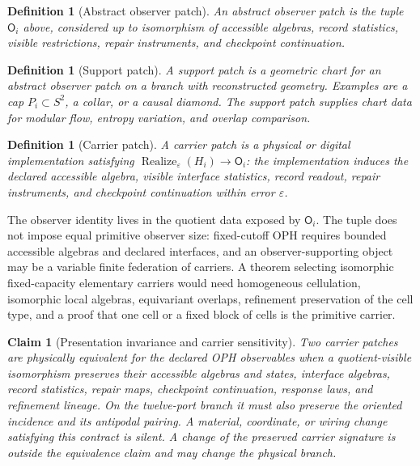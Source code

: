 \documentclass[11pt]{article}
\newtheorem{definition}[theorem]{Definition}
\newtheorem{claim}[theorem]{Claim}
\theoremstyle{remark}
\theoremstyle{plain}
\begin{document}
\begin{definition}[Abstract observer patch]
An abstract observer patch is the tuple \(\mathsf O_i\) above, considered up to isomorphism of
accessible algebras, record statistics, visible restrictions, repair instruments, and checkpoint
continuation.
\end{definition}

\begin{definition}[Support patch]
A support patch is a geometric chart for an abstract observer patch on a branch with reconstructed
geometry. Examples are a cap \(P_i\subset S^2\), a collar, or a causal diamond.
The support patch supplies chart data for modular flow, entropy variation, and overlap comparison.
\end{definition}

\begin{definition}[Carrier patch]
A carrier patch is a physical or digital implementation satisfying
\(\operatorname{Realize}_{\varepsilon}(H_i)\to\mathsf O_i\):
the implementation induces the declared accessible algebra, visible interface
statistics, record readout, repair instruments, and checkpoint continuation within error
\(\varepsilon\).
\end{definition}

The observer identity lives in the quotient data exposed by \(\mathsf O_i\).
The tuple does not impose equal primitive observer size: fixed-cutoff OPH
requires bounded accessible algebras and declared interfaces, and an
observer-supporting object may be a variable finite federation of carriers.
A theorem selecting isomorphic fixed-capacity elementary carriers would need
homogeneous cellulation, isomorphic local algebras, equivariant overlaps,
refinement preservation of the cell type, and a proof that one cell or a
fixed block of cells is the primitive carrier.

\begin{claim}[Presentation invariance and carrier sensitivity]\label{claim:implementation-invariance}
Two carrier patches are physically equivalent for the declared OPH observables when a
quotient-visible isomorphism preserves their accessible algebras and states, interface algebras,
record statistics, repair maps, checkpoint continuation, response laws, and refinement lineage.
On the twelve-port branch it must also preserve the oriented incidence and its
antipodal pairing. A material, coordinate, or wiring change satisfying this contract is silent. A
change of the preserved carrier signature is outside the equivalence claim and may change the
physical branch.
\end{claim}
\end{document}
